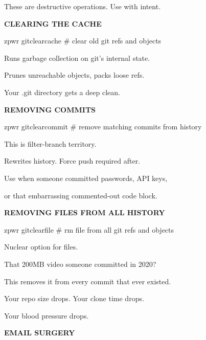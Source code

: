 \documentclass[11pt,a4paper,twoside]{book}
\begin{document}
These are destructive operations. Use with intent.


\vspace{12pt}
{\bfseries\color{neonyellow} CLEARING THE CACHE}\vspace{4pt}

\begin{codebox}
zpwr gitclearcache     \# clear old git refs and objects\\
\end{codebox}

Runs garbage collection on git's internal state.

Prunes unreachable objects, packs loose refs.

Your .git directory gets a deep clean.


\vspace{12pt}
{\bfseries\color{neonyellow} REMOVING COMMITS}\vspace{4pt}

\begin{codebox}
zpwr gitclearcommit    \# remove matching commits from history\\
\end{codebox}

This is filter-branch territory.

Rewrites history. Force push required after.

Use when someone committed passwords, API keys,

or that embarrassing commented-out code block.


\vspace{12pt}
{\bfseries\color{neonyellow} REMOVING FILES FROM ALL HISTORY}\vspace{4pt}

\begin{codebox}
zpwr gitclearfile      \# rm file from all git refs and objects\\
\end{codebox}

Nuclear option for files.

That 200MB video someone committed in 2020?

This removes it from every commit that ever existed.

Your repo size drops. Your clone time drops.

Your blood pressure drops.


\vspace{12pt}
{\bfseries\color{neonyellow} EMAIL SURGERY}\vspace{4pt}
\end{document}
